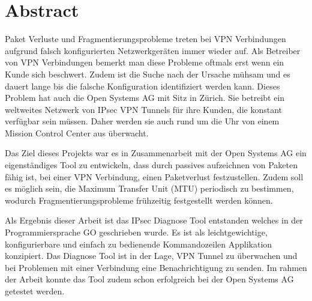 
\chapter*{Abstract}

Paket Verluste und Fragmentierungsprobleme treten bei VPN Verbindungen aufgrund falsch konfigurierten Netzwerkgeräten immer wieder auf. Als Betreiber von VPN Verbindungen bemerkt man diese Probleme oftmals erst wenn ein Kunde sich beschwert. Zudem ist die Suche nach der Ursache mühsam und es dauert lange bis die falsche Konfiguration identifiziert werden kann.
Dieses Problem hat auch die Open Systems AG mit Sitz in Zürich. Sie betreibt ein weltweites Netzwerk von IPsec VPN Tunnels für ihre Kunden, die konstant verfügbar sein müssen. Daher werden sie auch rund um die Uhr von einem Mission Control Center aus überwacht.

Das Ziel dieses Projekts war es in Zusammenarbeit mit der Open Systems AG ein eigenständiges Tool zu entwickeln, dass durch passives aufzeichnen von Paketen fähig ist, bei einer VPN Verbindung, einen Paketverlust festzustellen.
Zudem soll es möglich sein, die Maximum Transfer Unit (MTU) periodisch zu bestimmen, wodurch Fragmentierungsprobleme frühzeitig festgestellt werden können.

Als Ergebnis dieser Arbeit ist das IPsec Diagnose Tool entstanden welches in der Programmiersprache GO geschrieben wurde. Es ist als leichtgewichtige, konfigurierbare und einfach zu bedienende Kommandozeilen Applikation konzipiert. Das Diagnose Tool ist in der Lage, VPN Tunnel zu überwachen und bei Problemen mit einer Verbindung eine Benachrichtigung zu senden. Im rahmen der Arbeit konnte das Tool zudem schon erfolgreich bei der Open Systems AG getestet werden. 